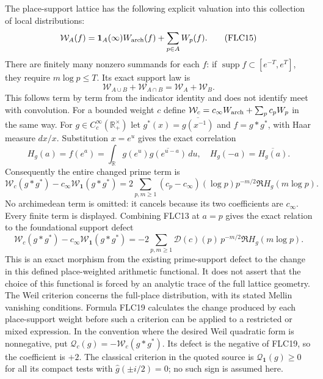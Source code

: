 \documentclass[11pt]{article}
\begin{document}
The place-support lattice has the following explicit valuation into
this collection of local distributions:
\[
\mathcal W_A(f)=\mathbf1_A(\infty)W_{\rm arch}(f)
                         +\sum_{p\in A}W_p(f).
\tag{FLC15}
\]
There are finitely many nonzero summands for each $f$: if
$\operatorname{supp}f\subset[e^{-T},e^T]$, they require
$m\log p\le T$. Its exact support law is
\[
\mathcal W_{A\cup B}+\mathcal W_{A\cap B}
                 =\mathcal W_A+\mathcal W_B.
\tag{FLC16}
\]
This follows term by term from the indicator identity and does not
identify meet with convolution. For a bounded weight $c$ define
$\mathcal W_c=c_\infty W_{\rm arch}+\sum_pc_pW_p$ in the same way.
For $g\in C_c^\infty(\mathbb R_+^\times)$ let
$g^*(x)=\overline{g(x^{-1})}$ and $f=g*g^*$, with Haar measure $dx/x$.
Substitution $x=e^u$ gives the exact correlation
\[
H_g(a)=f(e^a)=\int_{\mathbb R}
 g(e^u)\overline{g(e^{u-a})}\,du,
\quad H_g(-a)=\overline{H_g(a)}.
\tag{FLC17}
\]
Consequently the entire changed prime term is
\[
\boxed{\mathcal W_c(g*g^*)-
             c_\infty\mathcal W_{\mathbf1}(g*g^*)
 =2\sum_{p,m\ge1}(c_p-c_\infty)(\log p)p^{-m/2}
                              \Re H_g(m\log p).}
\tag{FLC18}
\]
No archimedean term is omitted: it cancels because its two coefficients
are $c_\infty$. Every finite term is displayed. Combining FLC13 at
$a=p$ gives the exact relation to the foundational support defect
\[
\mathcal W_c(g*g^*)-c_\infty\mathcal W_{\mathbf1}(g*g^*)
 =-2\sum_{p,m\ge1}\mathscr D(c)(p)\,p^{-m/2}
                              \Re H_g(m\log p).
\tag{FLC19}
\]
This is an exact morphism from the existing prime-support defect
to the change in this defined place-weighted arithmetic functional.
It does not assert that the choice of this functional is forced by
an analytic trace of the full lattice geometry.
The Weil criterion concerns the full-place distribution, with its
stated Mellin vanishing conditions. Formula FLC19 calculates the
change produced by each place-support weight before such a criterion
can be applied to a restricted or mixed expression. In the convention
where the desired Weil quadratic form is nonnegative, put
$\mathcal Q_c(g)=-\mathcal W_c(g*g^*)$. Its defect is the negative
of FLC19, so the coefficient is $+2$. The classical criterion in the
quoted source is $\mathcal Q_{\mathbf1}(g)\ge0$ for all its compact
tests with $\widehat g(\pm i/2)=0$; no such sign is assumed here.
\end{document}
